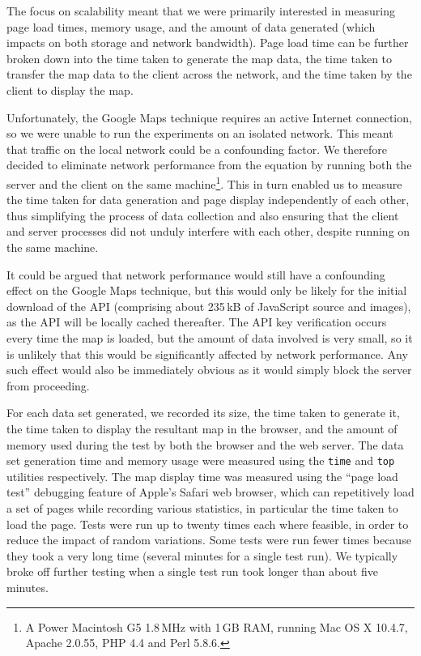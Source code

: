 \documentclass[acmtocl,acmnow]{acmtrans2m}
\begin{document}
The focus on scalability meant that we were primarily interested in
measuring page load times, memory usage, and the amount of data
generated (which impacts on both storage and network bandwidth). Page
load time can be further broken down into the time taken to generate the
map data, the time taken to transfer the map data to the client across
the network, and the time taken by the client to display the map.

Unfortunately, the Google Maps technique requires an active Internet
connection, so we were unable to run the experiments on an isolated
network. This meant that traffic on the local network could be a
confounding factor. We therefore decided to eliminate network
performance from the equation by running both the server and the client
on the same machine\footnote{A Power Macintosh G5 1.8\,MHz with 1\,GB
RAM, running Mac OS X 10.4.7, Apache 2.0.55, PHP 4.4 and Perl 5.8.6.}.
This in turn enabled us to measure the time taken for data generation
and page display independently of each other, thus simplifying the
process of data collection and also ensuring that the client and server
processes did not unduly interfere with each other, despite running on
the same machine.

It could be argued that network performance would still have a
confounding effect on the Google Maps technique, but this would only be
likely for the initial download of the API (comprising about 235\,kB of
JavaScript source and images), as the API will be locally cached
thereafter. The API key verification occurs every time the map is
loaded, but the amount of data involved is very small, so it is unlikely
that this would be significantly affected by network performance. Any
such effect would also be immediately obvious as it would simply block
the server from proceeding.

For each data set generated, we recorded its size, the time taken to
generate it, the time taken to display the resultant map in the browser,
and the amount of memory used during the test by both the browser and
the web server. The data set generation time and memory usage were
measured using the \texttt{time} and \texttt{top} utilities
respectively. The map display time was measured using the ``page load
test'' debugging feature of Apple's Safari web browser, which can
repetitively load a set of pages while recording various statistics, in
particular the time taken to load the page. Tests were run up to twenty
times each where feasible, in order to reduce the impact of random
variations. Some tests were run fewer times because they took a very
long time (several minutes for a single test run). We typically broke
off further testing when a single test run took longer than about five
minutes.
\end{document}
